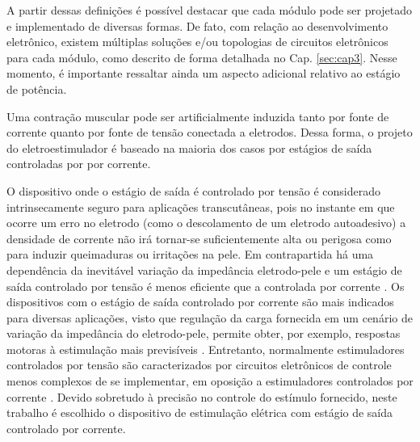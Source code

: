 A partir dessas definições é possível destacar que cada módulo pode ser projetado e implementado de diversas formas. De fato, com relação ao desenvolvimento eletrônico, existem múltiplas soluções e/ou topologias de circuitos eletrônicos para cada módulo, como descrito de forma detalhada no Cap. \ref{sec:cap3}. Nesse momento, é importante ressaltar ainda um aspecto adicional relativo ao estágio de potência. 

Uma contração muscular pode ser artificialmente induzida tanto por fonte de corrente quanto por fonte de tensão conectada a eletrodos. Dessa forma, o projeto do eletroestimulador é baseado na maioria dos casos por estágios de saída controladas por por corrente. 

O dispositivo onde o estágio de saída é controlado por tensão é considerado intrinsecamente seguro para aplicações transcutâneas, pois no instante em que ocorre um erro no eletrodo (como o descolamento de um eletrodo autoadesivo) a densidade de corrente não irá tornar-se suficientemente alta ou perigosa como para induzir queimaduras ou irritações na pele. Em contrapartida há uma dependência da inevitável variação da impedância eletrodo-pele e um estágio de saída controlado por tensão é menos eficiente que a controlada por corrente \cite{Wu2002AApplications}. Os dispositivos com o estágio de saída controlado por corrente são mais indicados para diversas aplicações, visto que regulação da carga fornecida em um cenário de variação da impedância do eletrodo-pele, permite obter, por exemplo, respostas motoras à estimulação mais previsíveis \cite{Wu2002AApplications}. Entretanto, normalmente estimuladores controlados por tensão são caracterizados por circuitos eletrônicos de controle menos complexos de se implementar, em oposição a estimuladores controlados por corrente \cite{Agarwala1986ProgrammableSystem, H.1990PowerStimulator}. Devido sobretudo à precisão no controle do estímulo fornecido, neste trabalho é escolhido o dispositivo de estimulação elétrica com estágio de saída controlado por corrente.